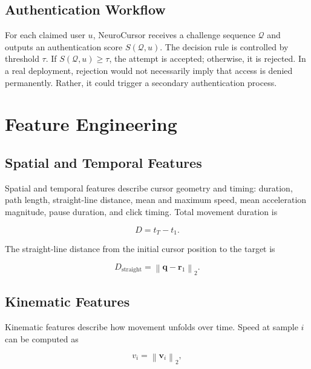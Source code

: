 \documentclass[conference]{IEEEtran}
\begin{document}
\subsection{Authentication Workflow}

For each claimed user $u$, NeuroCursor receives a challenge sequence $\mathcal{Q}$ and outputs an authentication score $S(\mathcal{Q},u)$. The decision rule is controlled by threshold $\tau$. If $S(\mathcal{Q},u)\geq \tau$, the attempt is accepted; otherwise, it is rejected. In a real deployment, rejection would not necessarily imply that access is denied permanently. Rather, it could trigger a secondary authentication process.

\section{Feature Engineering}

\subsection{Spatial and Temporal Features}

Spatial and temporal features describe cursor geometry and timing: duration,
path length, straight-line distance, mean and maximum speed, mean acceleration
magnitude, pause duration, and click timing. Total movement duration is

\begin{equation}
D = t_T - t_1.
\label{eq:movement_duration}
\end{equation}

The straight-line distance from the initial cursor position to the target is

\begin{equation}
D_{\mathrm{straight}}
=
\left\|
\mathbf{q}-\mathbf{r}_1
\right\|_2.
\label{eq:straight_distance}
\end{equation}

\subsection{Kinematic Features}

Kinematic features describe how movement unfolds over time. Speed at sample $i$ can be computed as

\begin{equation}
v_i
=
\left\|
\mathbf{v}_i
\right\|_2,
\label{eq:speed}
\end{equation}
\end{document}
